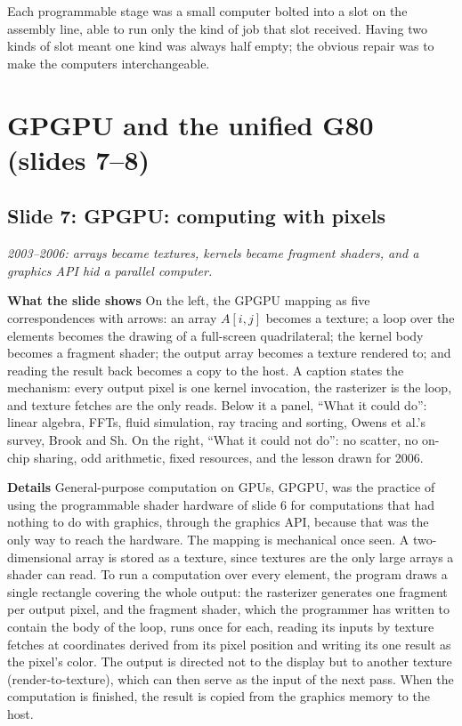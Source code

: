 \documentclass[11pt,letterpaper]{article}
\newcommand{\setstage}[1]{\colorlet{stagec}{#1}}
\newcommand{\slide}[3]{%
  \subsection[Slide #1: #2]{Slide #1: #2}%
  {\color{muted}\itshape #3\par}\medskip}
\newcommand{\para}[1]{\medskip\noindent\textbf{#1}\quad}
\newenvironment{intuition}{\begin{tcolorbox}[intuitionbox]}{\end{tcolorbox}}
\begin{document}
\begin{intuition}
Each programmable stage was a small computer bolted into a slot on the assembly line, able to run only the kind of job that slot received. Having two kinds of slot meant one kind was always half empty; the obvious repair was to make the computers interchangeable.
\end{intuition}
\setstage{emb}
\section{GPGPU and the unified G80 (slides 7--8)}

\slide{7}{GPGPU: computing with pixels}{2003--2006: arrays became textures, kernels became fragment shaders, and a graphics API hid a parallel computer.}

\para{What the slide shows} On the left, the GPGPU mapping as five correspondences with arrows: an array $A[i,j]$ becomes a texture; a loop over the elements becomes the drawing of a full-screen quadrilateral; the kernel body becomes a fragment shader; the output array becomes a texture rendered to; and reading the result back becomes a copy to the host. A caption states the mechanism: every output pixel is one kernel invocation, the rasterizer is the loop, and texture fetches are the only reads. Below it a panel, ``What it could do'': linear algebra, FFTs, fluid simulation, ray tracing and sorting, Owens et al.'s survey, Brook and Sh. On the right, ``What it could not do'': no scatter, no on-chip sharing, odd arithmetic, fixed resources, and the lesson drawn for 2006.

\para{Details} General-purpose computation on GPUs, GPGPU, was the practice of using the programmable shader hardware of slide 6 for computations that had nothing to do with graphics, through the graphics API, because that was the only way to reach the hardware. The mapping is mechanical once seen. A two-dimensional array is stored as a texture, since textures are the only large arrays a shader can read. To run a computation over every element, the program draws a single rectangle covering the whole output: the rasterizer generates one fragment per output pixel, and the fragment shader, which the programmer has written to contain the body of the loop, runs once for each, reading its inputs by texture fetches at coordinates derived from its pixel position and writing its one result as the pixel's color. The output is directed not to the display but to another texture (render-to-texture), which can then serve as the input of the next pass. When the computation is finished, the result is copied from the graphics memory to the host.
\end{document}
